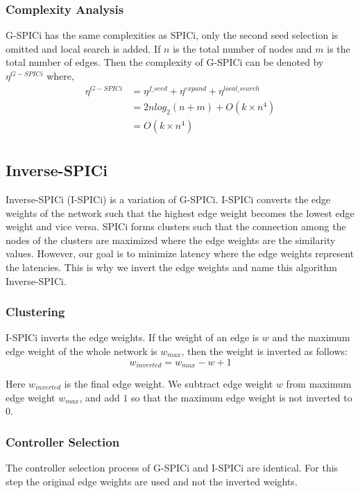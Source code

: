 \documentclass[a4paper,twocolumn,preprint]{elsarticle}
\begin{document}
\subsubsection{Complexity Analysis}
G-SPICi has the same complexities as SPICi, only the second seed selection is omitted and local search is added. If $n$ is the total number of nodes and $m$ is the total number of edges. Then the complexity of G-SPICi can be denoted by $\eta^{G-SPICi}$ where,
\begin{equation}
\begin{split}
\eta^{G-SPICi} &= \eta^{f\_seed} + \eta^{expand} + \eta^{local\_search}\\
&= 2nlog_2(n+m)+O(k\times n^4)\\
&= O(k\times n^4)\\
\end{split}
\end{equation}

\subsection{Inverse-SPICi}

Inverse-SPICi (I-SPICi) is a variation of G-SPICi. I-SPICi converts the edge weights of the network such that the highest edge weight becomes the lowest edge weight and vice versa. SPICi forms clusters such that the connection among the nodes of the clusters are maximized where the edge weights are the similarity values. However, our goal is to minimize latency where the edge weights represent the latencies. This is why we invert the edge weights and name this algorithm Inverse-SPICi.
\subsubsection{Clustering}
I-SPICi inverts the edge weights. If the weight of an edge is $w$ and the maximum edge weight of the whole network is $w_{max}$, then the weight is inverted as follows:
\[
w_{inverted} = w_{max} - w + 1
\]

Here $w_{inverted}$ is the final edge weight. We subtract edge weight $w$ from maximum edge weight $w_{max}$, and add $1$ so that the maximum edge weight is not inverted to $0$.
\subsubsection{Controller Selection}
The controller selection process of G-SPICi and I-SPICi are identical. For this step the original edge weights are used and not the inverted weights.
\end{document}
